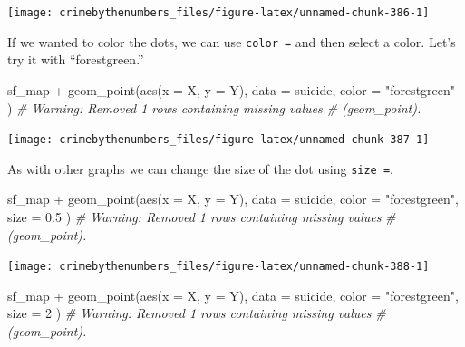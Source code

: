 \documentclass[
  a4paper,
]{krantz}
\makeatletter
\newenvironment{Shaded}{\begin{snugshade}}{\end{snugshade}}
\newcommand{\AttributeTok}[1]{\textcolor[rgb]{0.77,0.63,0.00}{#1}}
\newcommand{\CommentTok}[1]{\textcolor[rgb]{0.56,0.35,0.01}{\textit{#1}}}
\newcommand{\DecValTok}[1]{\textcolor[rgb]{0.00,0.00,0.81}{#1}}
\newcommand{\FloatTok}[1]{\textcolor[rgb]{0.00,0.00,0.81}{#1}}
\newcommand{\FunctionTok}[1]{\textcolor[rgb]{0.00,0.00,0.00}{#1}}
\newcommand{\NormalTok}[1]{#1}
\newcommand{\SpecialCharTok}[1]{\textcolor[rgb]{0.00,0.00,0.00}{#1}}
\newcommand{\StringTok}[1]{\textcolor[rgb]{0.31,0.60,0.02}{#1}}
\newenvironment{kframe}{%
\medskip{}
\setlength{\fboxsep}{.8em}
 \def\at@end@of@kframe{}%
 \ifinner\ifhmode%
  \def\at@end@of@kframe{\end{minipage}}%
  \begin{minipage}{\columnwidth}%
 \fi\fi%
 \def\FrameCommand##1{\hskip\@totalleftmargin \hskip-\fboxsep
 \colorbox{shadecolor}{##1}\hskip-\fboxsep
     \hskip-\linewidth \hskip-\@totalleftmargin \hskip\columnwidth}%
 \MakeFramed {\advance\hsize-\width
   \@totalleftmargin\z@ \linewidth\hsize
   \@setminipage}}%
 {\par\unskip\endMakeFramed%
 \at@end@of@kframe}
\renewenvironment{Shaded}{\begin{kframe}}{\end{kframe}}
\makeatother
\begin{document}
\begin{center}\texttt{[image: crimebythenumbers\_files/figure-latex/unnamed-chunk-386-1]} \end{center}

If we wanted to color the dots, we can use \texttt{color\ =}
and then select a color. Let's try it with ``forestgreen.''

\begin{Shaded}
\begin{Highlighting}[]
\NormalTok{sf\_map }\SpecialCharTok{+}
  \FunctionTok{geom\_point}\NormalTok{(}\FunctionTok{aes}\NormalTok{(}\AttributeTok{x =}\NormalTok{ X, }\AttributeTok{y =}\NormalTok{ Y),}
    \AttributeTok{data  =}\NormalTok{ suicide,}
    \AttributeTok{color =} \StringTok{"forestgreen"}
\NormalTok{  )}
\CommentTok{\# Warning: Removed 1 rows containing missing values}
\CommentTok{\# (geom\_point).}
\end{Highlighting}
\end{Shaded}

\begin{center}\texttt{[image: crimebythenumbers\_files/figure-latex/unnamed-chunk-387-1]} \end{center}

As with other graphs we can change the size of the dot using
\texttt{size\ =}.

\begin{Shaded}
\begin{Highlighting}[]
\NormalTok{sf\_map }\SpecialCharTok{+}
  \FunctionTok{geom\_point}\NormalTok{(}\FunctionTok{aes}\NormalTok{(}\AttributeTok{x =}\NormalTok{ X, }\AttributeTok{y =}\NormalTok{ Y),}
    \AttributeTok{data  =}\NormalTok{ suicide,}
    \AttributeTok{color =} \StringTok{"forestgreen"}\NormalTok{,}
    \AttributeTok{size  =} \FloatTok{0.5}
\NormalTok{  )}
\CommentTok{\# Warning: Removed 1 rows containing missing values}
\CommentTok{\# (geom\_point).}
\end{Highlighting}
\end{Shaded}

\begin{center}\texttt{[image: crimebythenumbers\_files/figure-latex/unnamed-chunk-388-1]} \end{center}

\begin{Shaded}
\begin{Highlighting}[]
\NormalTok{sf\_map }\SpecialCharTok{+}
  \FunctionTok{geom\_point}\NormalTok{(}\FunctionTok{aes}\NormalTok{(}\AttributeTok{x =}\NormalTok{ X, }\AttributeTok{y =}\NormalTok{ Y),}
    \AttributeTok{data  =}\NormalTok{ suicide,}
    \AttributeTok{color =} \StringTok{"forestgreen"}\NormalTok{,}
    \AttributeTok{size  =} \DecValTok{2}
\NormalTok{  )}
\CommentTok{\# Warning: Removed 1 rows containing missing values}
\CommentTok{\# (geom\_point).}
\end{Highlighting}
\end{Shaded}
\end{document}
